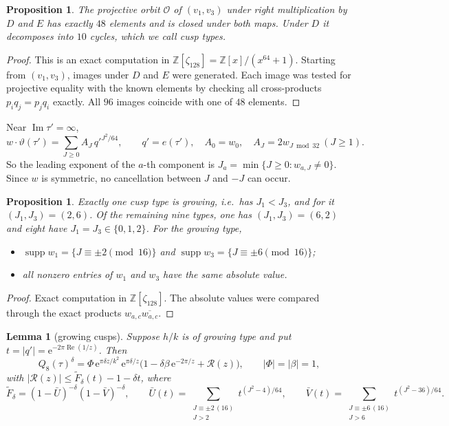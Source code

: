 \documentclass[11pt]{amsart}
\newtheorem{proposition}[theorem]{Proposition}
\newtheorem{lemma}[theorem]{Lemma}
\theoremstyle{remark}
\theoremstyle{definition}
\newcommand{\Z}{\mathbb Z}
\newcommand{\cO}{\mathcal O}
\newcommand{\cR}{\mathcal R}
\newcommand{\Rea}{\operatorname{Re}}
\newcommand{\Ima}{\operatorname{Im}}
\newcommand{\e}{\mathrm e}
\begin{document}
\begin{proposition}\label{prop:orbit}
The projective orbit $\cO$ of $(v_1,v_3)$ under right multiplication by $D$ and $E$ has exactly $48$ elements and is closed under both maps. Under $D$ it decomposes into $10$ cycles, which we call \emph{cusp types}.
\end{proposition}

\begin{proof}
This is an exact computation in $\Z[\zeta_{128}]=\Z[x]/(x^{64}+1)$. Starting from $(v_1,v_3)$, images under $D$ and $E$ were generated. Each image was tested for projective equality with the known elements by checking all cross-products $p_iq_j=p_jq_i$ exactly. All $96$ images coincide with one of $48$ elements.
\end{proof}

Near $\Ima\tau'=\infty$,
\[
w\cdot\vartheta(\tau')=\sum_{J\ge0}A_J\,q'^{J^2/64},\qquad q'=e(\tau'),\quad A_0=w_0,\quad A_J=2w_{J\bmod32}\ (J\ge1).
\]
So the leading exponent of the $a$-th component is $J_a=\min\{J\ge0:w_{a,J}\ne0\}$. Since $w$ is symmetric, no cancellation between $J$ and $-J$ can occur.

\begin{proposition}\label{prop:types}
Exactly one cusp type is \emph{growing}, i.e.\ has $J_1<J_3$, and for it $(J_1,J_3)=(2,6)$. Of the remaining nine types, one has $(J_1,J_3)=(6,2)$ and eight have $J_1=J_3\in\{0,1,2\}$. For the growing type,
\begin{itemize}[leftmargin=2em]
\item $\operatorname{supp}w_1=\{J\equiv\pm2\pmod{16}\}$ and $\operatorname{supp}w_3=\{J\equiv\pm6\pmod{16}\}$;
\item all nonzero entries of $w_1$ and $w_3$ have the same absolute value.
\end{itemize}
\end{proposition}

\begin{proof}
Exact computation in $\Z[\zeta_{128}]$. The absolute values were compared through the exact products $w_{a,c}\overline{w_{a,c}}$.
\end{proof}

\begin{lemma}[growing cusps]\label{lem:growing}
Suppose $h/k$ is of growing type and put $t=|q'|=\e^{-2\pi\Rea(1/z)}$. Then
\[
Q_8(\tau)^\delta=\Phi\,\e^{\pi\delta z/k^2}\,\e^{\pi\delta/z}\Big(1-\delta\beta\,\e^{-2\pi/z}+\cR(z)\Big),\qquad|\Phi|=|\beta|=1,
\]
with $|\cR(z)|\le\widetilde F_\delta(t)-1-\delta t$, where
\[
\widetilde F_\delta=(1-\bar U)^{-\delta}(1-\bar V)^{-\delta},\qquad \bar U(t)=\sum_{\substack{J\equiv\pm2\,(16)\\J>2}}t^{(J^2-4)/64},\qquad \bar V(t)=\sum_{\substack{J\equiv\pm6\,(16)\\J>6}}t^{(J^2-36)/64}.
\]
\end{lemma}
\end{document}
